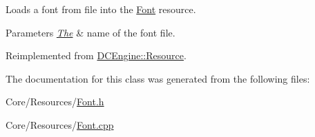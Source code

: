 Loads a font from file into the \hyperlink{classDCEngine_1_1Font}{Font} resource. 


\begin{DoxyParams}{Parameters}
{\em \hyperlink{classThe}{The}} & name of the font file. \\
\hline
\end{DoxyParams}


Reimplemented from \hyperlink{classDCEngine_1_1Resource_a99b06ae1da559efdc71edb528cac7caa}{D\-C\-Engine\-::\-Resource}.



The documentation for this class was generated from the following files\-:\begin{DoxyCompactItemize}
\item 
Core/\-Resources/\hyperlink{Font_8h}{Font.\-h}\item 
Core/\-Resources/\hyperlink{Font_8cpp}{Font.\-cpp}\end{DoxyCompactItemize}
